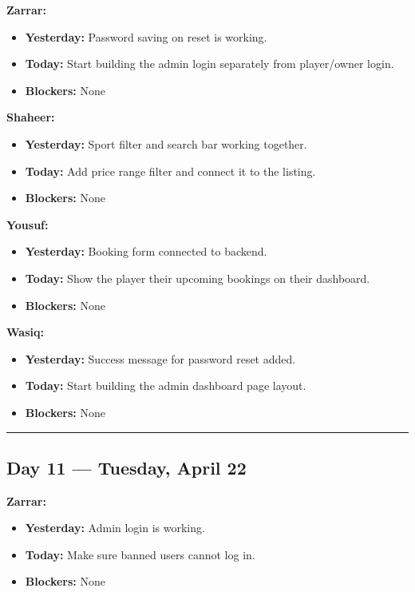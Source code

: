 \documentclass[12pt,a4paper]{article}
\begin{document}
\textbf{Zarrar:}
\begin{itemize}[noitemsep]
    \item \textbf{Yesterday:} Password saving on reset is working.
    \item \textbf{Today:} Start building the admin login separately from player/owner login.
    \item \textbf{Blockers:} None
\end{itemize}

\textbf{Shaheer:}
\begin{itemize}[noitemsep]
    \item \textbf{Yesterday:} Sport filter and search bar working together.
    \item \textbf{Today:} Add price range filter and connect it to the listing.
    \item \textbf{Blockers:} None
\end{itemize}

\textbf{Yousuf:}
\begin{itemize}[noitemsep]
    \item \textbf{Yesterday:} Booking form connected to backend.
    \item \textbf{Today:} Show the player their upcoming bookings on their dashboard.
    \item \textbf{Blockers:} None
\end{itemize}

\textbf{Wasiq:}
\begin{itemize}[noitemsep]
    \item \textbf{Yesterday:} Success message for password reset added.
    \item \textbf{Today:} Start building the admin dashboard page layout.
    \item \textbf{Blockers:} None
\end{itemize}

\vspace{1em}\hrule\vspace{1em}

\subsection*{Day 11 --- Tuesday, April 22}

\textbf{Zarrar:}
\begin{itemize}[noitemsep]
    \item \textbf{Yesterday:} Admin login is working.
    \item \textbf{Today:} Make sure banned users cannot log in.
    \item \textbf{Blockers:} None
\end{itemize}
\end{document}
